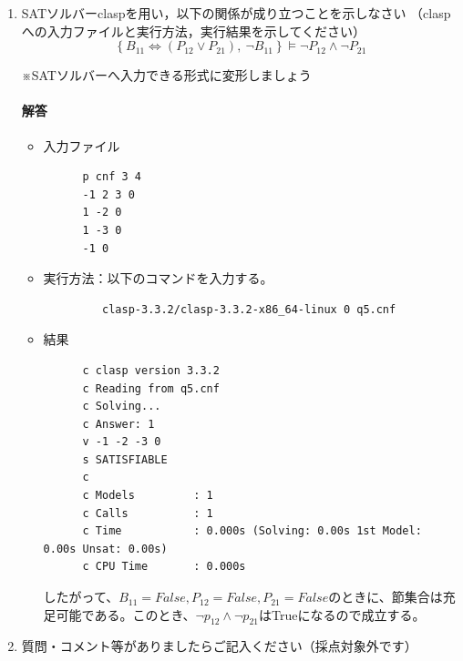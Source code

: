 \documentclass[dvipdfmx]{jsarticle}
\begin{document}
\begin{enumerate}
\item SATソルバーclaspを用い，以下の関係が成り立つことを示しなさい
（claspへの入力ファイルと実行方法，実行結果を示してください）
  \[
  \left\{ B_{11}\Leftrightarrow (P_{12}\lor P_{21}),~\neg B_{11}  \right\}
  \models
  \neg P_{12}\land \neg P_{21}
  \]

  ※SATソルバーへ入力できる形式に変形しましょう
  \paragraph{解答}
  \begin{itemize}
    \item 入力ファイル
    \begin{verbatim}
      p cnf 3 4
      -1 2 3 0
      1 -2 0
      1 -3 0
      -1 0
    \end{verbatim}
    \item 実行方法：以下のコマンドを入力する。
    \begin{verbatim}
         clasp-3.3.2/clasp-3.3.2-x86_64-linux 0 q5.cnf
    \end{verbatim}
    \item 結果
    \begin{verbatim}
      c clasp version 3.3.2
      c Reading from q5.cnf
      c Solving...
      c Answer: 1
      v -1 -2 -3 0
      s SATISFIABLE
      c
      c Models         : 1
      c Calls          : 1
      c Time           : 0.000s (Solving: 0.00s 1st Model: 0.00s Unsat: 0.00s)
      c CPU Time       : 0.000s
    \end{verbatim}
    したがって、$B_11 = False, P_12 = False, P_21 = False$のときに、節集合は充足可能である。このとき、$\neg p_12 \wedge \neg p_21$はTrueになるので成立する。
  \end{itemize}


\item 質問・コメント等がありましたらご記入ください（採点対象外です）

\end{enumerate}
\end{document}

